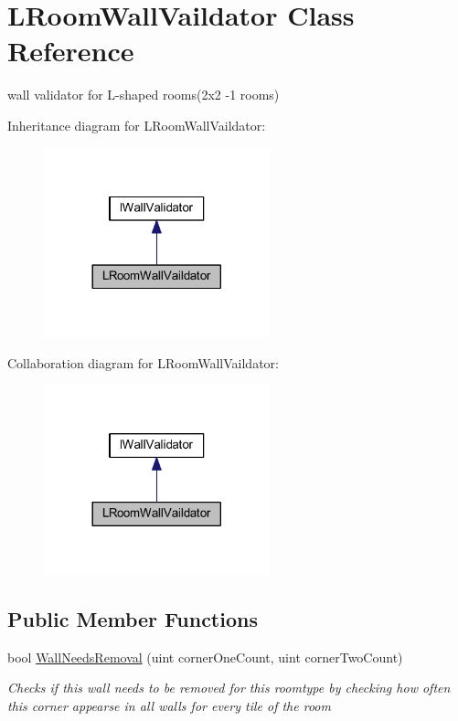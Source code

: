 \hypertarget{class_l_room_wall_vaildator}{}\section{L\+Room\+Wall\+Vaildator Class Reference}
\label{class_l_room_wall_vaildator}


wall validator for L-\/shaped rooms(2x2 -\/1 rooms)  




Inheritance diagram for L\+Room\+Wall\+Vaildator\+:
\nopagebreak
\begin{figure}[H]
\begin{center}
\leavevmode
\includegraphics[width=185pt]{class_l_room_wall_vaildator__inherit__graph}
\end{center}
\end{figure}


Collaboration diagram for L\+Room\+Wall\+Vaildator\+:
\nopagebreak
\begin{figure}[H]
\begin{center}
\leavevmode
\includegraphics[width=185pt]{class_l_room_wall_vaildator__coll__graph}
\end{center}
\end{figure}
\subsection*{Public Member Functions}
\begin{DoxyCompactItemize}
\item 
bool \mbox{\hyperlink{class_l_room_wall_vaildator_a1de3495c1d8cc0a4591b617d2137b497}{Wall\+Needs\+Removal}} (uint corner\+One\+Count, uint corner\+Two\+Count)
\begin{DoxyCompactList}\small\item\em Checks if this wall needs to be removed for this roomtype by checking how often this corner appearse in all walls for every tile of the room \end{DoxyCompactList}\end{DoxyCompactItemize}


